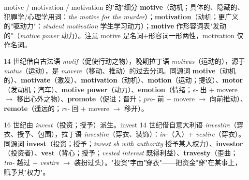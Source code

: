 \documentclass[../main.tex]{subfiles}
\begin{document}


\begin{gram}{motive / motivation / motivation 的"动"细分}
\textbf{motive}（动机；具体的、隐藏的、犯罪学/心理学用词：\textit{the motive for the murder}）；\textbf{motivation}（动机；更广义的"驱动力"：\textit{student motivation} 学生学习动力）；\textbf{motive} 作形容词表"发动的"（\textit{motive power} 动力）。注意 motive 是名词+形容词一形两性，motivation 仅作名词。
\end{gram}

\begin{origin}
14 世纪借自古法语 \textit{motif}（促使行动之物），晚期拉丁语 \textit{motivus}（运动的），源于 \textit{motus}（运动），是 \textit{movere}（移动、推动）的过去分词。同源词 \textbf{motive}（动机的）、\textbf{motivate}（激发）、\textbf{motivation}（动机）、\textbf{motion}（运动；提议）、\textbf{motor}（发动机；汽车）、\textbf{motive power}（动力）、\textbf{emotion}（情绪；\textit{e-} 出 + movere $\to$ 移出心外之物）、\textbf{promote}（促进；晋升；\textit{pro-} 前 + movere $\to$ 向前推动）、\textbf{remote}（遥远的；\textit{re-} 回 + movere $\to$ 移开）。
\end{origin}




\begin{origin}
16 世纪由 \textit{invest}（投资；授予）派生。invest 14 世纪借自意大利语 \textit{investire}（穿衣、授予、包围），拉丁语 \textit{investire}（穿衣、装饰）：\textit{in-}（入）+ \textit{vestire}（穿衣）。同源词 \textbf{invest}（投资；授予；\textit{invest sb with authority} 授予某人权力）、\textbf{investor}（投资者）、\textbf{vest}（背心；授予；\textit{vested interest} 既得利益）、\textbf{travesty}（歪曲；\textit{tra-} 越过 + \textit{vestire} $\to$ 装扮过头）。"投资"字面"穿衣"——把资金"穿"在某事上，赋予其"权力"。
\end{origin}
\end{document}
